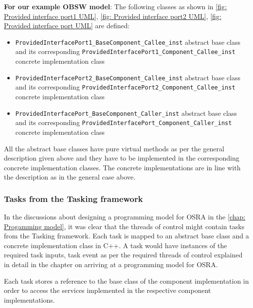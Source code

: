 \textbf{For our example OBSW model}: The following classes as shown in \cref{fig: Provided interface port1 UML}, \cref{fig: Provided interface port2 UML}, \cref{fig: Provided interface port UML} are defined:
\begin{itemize}
\item \texttt{Provided\allowbreak Interface\allowbreak Port1\_\allowbreak Base\allowbreak Component\_\allowbreak Callee\_\allowbreak inst} abstract base class and its corresponding \texttt{Provided\allowbreak Interface\allowbreak Port1\_\allowbreak Component\_\allowbreak Callee\_\allowbreak inst} concrete implementation class
\item \texttt{Provided\allowbreak Interface\allowbreak Port2\_\allowbreak Base\allowbreak Component\_\allowbreak Callee\_\allowbreak inst} abstract base class and its corresponding \texttt{Provided\allowbreak Interface\allowbreak Port2\_\allowbreak Component\_\allowbreak Callee\_\allowbreak inst} concrete implementation class
\item \texttt{Provided\allowbreak Interface\allowbreak Port\_\allowbreak Base\allowbreak Component\_\allowbreak Caller\_\allowbreak inst} abstract base class and its corresponding \texttt{Provided\allowbreak Interface\allowbreak Port\_\allowbreak Component\_\allowbreak Caller\_\allowbreak inst} concrete implementation class 
\end{itemize} 

All the abstract base classes have pure virtual methods as per the general description given above and they have to be implemented in the corresponding concrete implementation classes. The concrete implementations are in line with the description as in the general case above.

\subsubsection{\textbf{Tasks from the Tasking framework}}
In the discussions about designing a programming model for OSRA in the \cref{chap: Progamming model}, it was clear that the threads of control might contain tasks from the Tasking framework. Each task is mapped to an abstract base class and a concrete implementation class in C++. A task would have instances of the required task inputs, task event as per the required threads of control explained in detail in the chapter on arriving at a programming model for OSRA.

Each task stores a reference to the base class of the component implementation in order to access the services implemented in the respective component implementations.  

